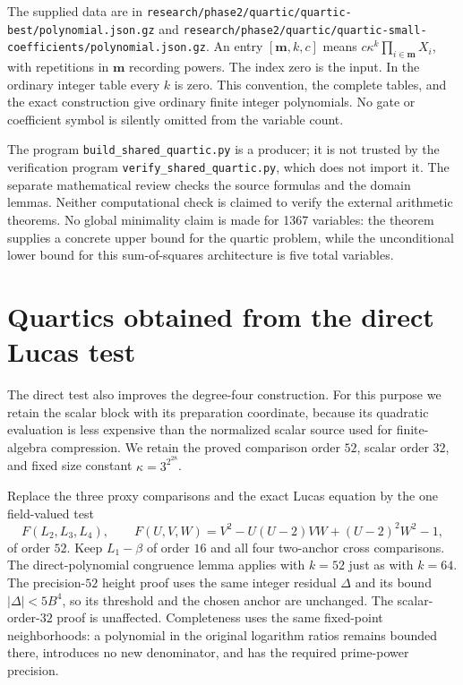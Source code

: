 \documentclass[11pt]{article}
\theoremstyle{definition}
\begin{document}
The supplied data are in
\nolinkurl{research/phase2/quartic/quartic-best/polynomial.json.gz} and
\nolinkurl{research/phase2/quartic/quartic-small-coefficients/polynomial.json.gz}.
An entry $[\mathbf m,k,c]$ means $c\kappa^k\prod_{i\in\mathbf m}X_i$,
with repetitions in $\mathbf m$ recording powers.  The index zero is the
input.  In the ordinary integer table every $k$ is zero.  This convention,
the complete tables, and the exact construction give ordinary finite
integer polynomials.  No gate or coefficient symbol is silently omitted
from the variable count.

The program \nolinkurl{build_shared_quartic.py} is a producer; it is not
trusted by the verification program
\nolinkurl{verify_shared_quartic.py}, which does not import it.
The separate mathematical review checks the source formulas and the
domain lemmas.  Neither computational check is claimed to verify the
external arithmetic theorems.  No global minimality claim is made for
1367 variables: the theorem supplies a concrete upper bound for the
quartic problem, while the unconditional lower bound for this
sum-of-squares architecture is five total variables.


\section{Quartics obtained from the direct Lucas test}
\label{sec:p3-quartics}

The direct test also improves the degree-four construction.
For this purpose we retain the scalar block with its preparation
coordinate, because its quadratic evaluation is less expensive
than the normalized scalar source used for finite-algebra
compression. We retain the proved comparison order $52$,
scalar order $32$, and fixed size constant
$\kappa=3^{2^{28}}$.

Replace the three proxy comparisons and the exact Lucas equation
by the one field-valued test
\[
 F(L_2,L_3,L_4),\qquad
 F(U,V,W)=V^2-U(U-2)VW+(U-2)^2W^2-1,
\]
of order $52$. Keep $L_1-\beta$ of order $16$ and all four
two-anchor cross comparisons. The direct-polynomial congruence
lemma applies with $k=52$ just as with $k=64$.
The precision-$52$ height proof uses the same integer residual
$\Delta$ and its bound $|\Delta|<5B^4$, so its threshold and
the chosen anchor are unchanged. The scalar-order-$32$ proof
is unaffected. Completeness uses the same fixed-point
neighborhoods: a polynomial in the original logarithm ratios
remains bounded there, introduces no new denominator, and
has the required prime-power precision.
\end{document}
